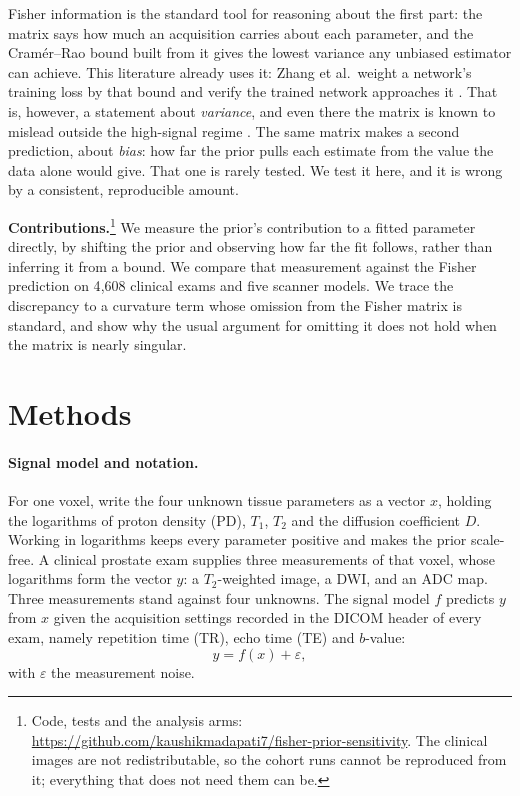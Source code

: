 \documentclass{article}
\begin{document}
Fisher information is the standard tool for reasoning about the first part: the matrix says how
much an acquisition carries about each parameter, and the Cram\'er--Rao bound built from it gives
the lowest variance any unbiased estimator can achieve. This literature already uses it: Zhang
et al.\ weight a network's training loss by that bound and verify the trained network approaches
it \cite{zhang2022}. That is, however, a statement about \emph{variance}, and even there the
matrix is known to mislead outside the high-signal regime \cite{vallisneri2008}. The same matrix
makes a second prediction, about \emph{bias}: how far the prior pulls each estimate from the value
the data alone would give. That one is rarely tested. We test it here, and it is wrong
by a consistent, reproducible amount.

\medskip\noindent\textbf{Contributions.}\footnote{Code, tests and the analysis arms:
\url{https://github.com/kaushikmadapati7/fisher-prior-sensitivity}. The clinical images are
not redistributable, so the cohort runs cannot be reproduced from it; everything that does not need
them can be.} We measure the prior's contribution to a fitted parameter
directly, by shifting the prior and observing how far the fit follows, rather than inferring it
from a bound. We compare that measurement against the Fisher prediction on 4{,}608 clinical exams
and five scanner models. We trace the discrepancy to a curvature term whose omission from the
Fisher matrix is standard, and show why the usual argument for omitting it does not hold when the
matrix is nearly singular.

\section{Methods}

\paragraph{Signal model and notation.} For one voxel, write the four unknown tissue parameters as
a vector $x$, holding the logarithms of proton density (PD), $T_1$, $T_2$ and the diffusion
coefficient $D$. Working in
logarithms keeps every parameter positive and makes the prior scale-free. A clinical prostate exam
supplies three measurements of that voxel, whose logarithms form the vector $y$: a
$T_2$-weighted image, a DWI, and an ADC map. Three measurements stand against four unknowns. The
signal model $f$ predicts $y$ from $x$ given the acquisition settings recorded in the DICOM header
of every exam, namely repetition time (TR), echo time (TE) and $b$-value:
\begin{equation*}
  y = f(x) + \varepsilon ,
\end{equation*}
with $\varepsilon$ the measurement noise.
\end{document}
